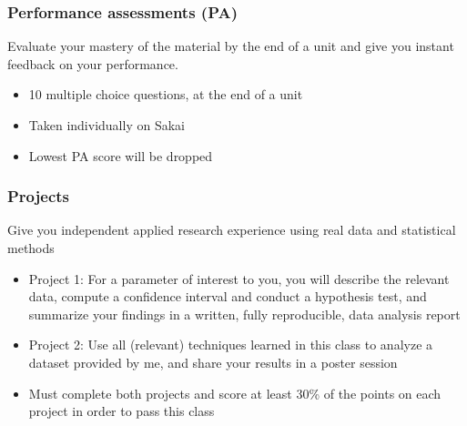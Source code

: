 \documentclass[11pt,containsverbatim,handout,xcolor=xelatex,dvipsnames,table]{beamer}
\begin{document}

\begin{frame}
\frametitle{Performance assessments (PA)}

 Evaluate your mastery of the material by the end of a unit and give you instant feedback on your performance.

\begin{itemize}

\item 10 multiple choice questions, at the end of a unit

\item Taken individually on Sakai

\item Lowest PA score will be dropped

\end{itemize}

\end{frame}


\begin{frame}
\frametitle{Projects}

 Give you independent applied research experience using real data and statistical methods

\begin{itemize}

\item Project 1: For a parameter of interest to you, you will describe the relevant data, compute a confidence interval and conduct a hypothesis test, and summarize your findings in a written, fully reproducible, data analysis report

\item Project 2: Use all (relevant) techniques learned in this class to analyze a dataset provided by me, and share your results in a poster session

\item Must complete both projects and score at least 30\% of the points on each project in order to pass this class

\end{itemize}

\end{frame}

\end{document}
